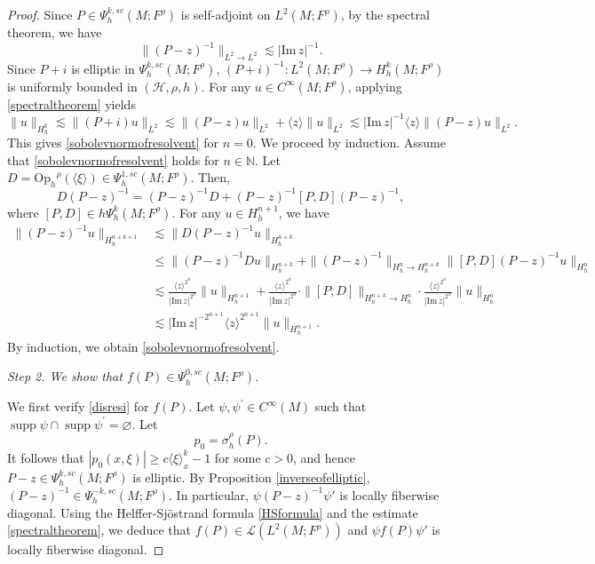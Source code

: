 \documentclass[10pt,a4paper]{amsart}
\newcommand\N{\ensuremath{\mathbb{N}}}
\newcommand\Oph{\ensuremath{\mathrm{Op}_h}}
\begin{document}
\begin{proof}
Since $P \in \Psi^{k,sc}_{h}(M;F^\rho)$ is self-adjoint on $L^2(M;F^{\rho})$, by the spectral theorem, we have 
\begin{equation}\label{spectraltheorem}
\|(P-z)^{-1}\|_{L^2\to L^2} \lesssim |\mathrm{Im} \, z|^{-1}.
\end{equation}
Since $P+i$ is elliptic in $\Psi^{k,sc}_h(M;F^\rho)$, $(P+i)^{-1}: L^2(M;F^{\rho})\to H^{k}_h(M;F^{\rho})$ is uniformly bounded in $(\mathcal{H},\rho,h)$. For any $u\in C^{\infty}(M;F^{\rho})$, applying \eqref{spectraltheorem} yields
\begin{equation*}
\|u\|_{H^{k}_h}\lesssim \|(P+i)u\|_{L^2}\lesssim \|(P-z)u\|_{L^2}+\langle z\rangle\|u\|_{L^2}\lesssim |\mathrm{Im} \, z|^{-1} \langle z\rangle \|(P-z)u\|_{L^2}.
\end{equation*}
This gives \eqref{sobolevnormofresolvent} for $n=0$. We proceed by induction. Assume that \eqref{sobolevnormofresolvent} holds for $n\in \N$. Let $D=\Oph^{\rho}(\langle \xi \rangle) \in \Psi^{1,sc}_h(M;F^\rho)$. Then,
\begin{equation*}
    D(P-z)^{-1}=(P-z)^{-1}D+(P-z)^{-1}[P,D](P-z)^{-1},
\end{equation*}
where $[P,D]\in h\Psi^k_h(M;F^\rho)$. For any $u \in H^{n+1}_{h}$, we have
\begin{equation*}
\begin{aligned}
\|(P-z)^{-1}u\|_{H^{n+k+1}_h} &\lesssim \|D(P-z)^{-1}u\|_{H^{n+k}_h}\\
& \leq\|(P-z)^{-1}Du\|_{H^{n+k}_h}+\|(P-z)^{-1}\|_{H^{n}_h\to H^{n+k}_{h}}  \|[P,D](P-z)^{-1}u\|_{H^{n}_h}\\
&\lesssim  \frac{\langle z\rangle^{2^n}}{|\mathrm{Im} \, z|^{2^n}}\|u\|_{H^{n+1}_h}+\frac{\langle z\rangle^{2^n}}{|\mathrm{Im} \, z|^{2^n}} \cdot \|[P,D]\|_{H^{n+k}_h\to H^n_h} \cdot\frac{\langle z\rangle^{2^n}}{|\mathrm{Im} \, z|^{2^n}}\|u\|_{H^n_h}\\
&\lesssim |\mathrm{Im} \, z|^{-2^{n+1}} \langle z\rangle^{2^{n+1}} \|u\|_{H^{n+1}_h}.
\end{aligned}
\end{equation*}
By induction, we obtain \eqref{sobolevnormofresolvent}.

\emph{Step 2. We show that $f(P)\in \Psi^{0,sc}_h(M;F^\rho)$.} 

We first verify \eqref{disresi} for $f(P)$. Let $\psi, \psi^{\prime} \in C^{\infty}(M)$ such that $\operatorname{supp} \psi \cap \operatorname{supp} \psi^{\prime}=\varnothing$. Let 
\begin{equation*}
    p_{0}=\sigma^{\rho}_{h}(P).
\end{equation*}
It follows that $|p_{0}(x,\xi)|\geq c\langle \xi \rangle_{x}^k-1$ for some $c>0$, and hence $P -z \in \Psi^{k,sc}_{h}(M;F^\rho)$ is elliptic. By Proposition \ref{inverseofelliptic}, $(P-z)^{-1} \in \Psi^{-k,sc}_{h}(M;F^\rho)$. In particular, $\psi (P-z)^{-1} \psi'$ is locally fiberwise diagonal. Using the Helffer-Sj\"{o}strand formula \eqref{HSformula} and the estimate \eqref{spectraltheorem}, we deduce that $f(P)\in \mathcal{L}(L^2(M;F^{\rho}))$ and $\psi f(P)\psi'$ is locally fiberwise diagonal. 


\end{proof}
\end{document}
